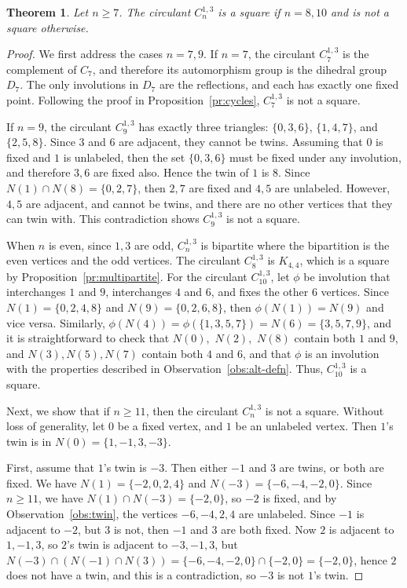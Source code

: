 \documentclass{article}
\newtheorem{theorem}{Theorem}[section]
\theoremstyle{definition}
\begin{document}
\begin{theorem} \label{thm:circ-1-3}
Let $n\geq 7$. 
The circulant $C_{n}^{1,3}$ is a square if $n=8,10$ and is not a square otherwise. 
\end{theorem}
\begin{proof}

We first address the cases $n=7,9$. If $n=7$, the circulant $C_7^{1,3}$ is the complement of $C_7$, and therefore its automorphism group is the dihedral group $D_7$. The only involutions in $D_7$ are the reflections, and each has exactly one fixed point. Following the proof in Proposition~\ref{pr:cycles},  $C_7^{1,3}$ is not a square. 

If $n=9$, the circulant $C_9^{1,3}$ has exactly three triangles: $\{0,3,6\}$,
$\{1,4,7\}$, and $\{2,5,8\}$. Since $3$ and $6$ are adjacent, they cannot be twins. Assuming that $0$ is fixed and $1$ is unlabeled, then the set $\{0,3,6\}$ must be fixed under any involution, and therefore $3,6$ are fixed also. Hence the twin of $1$ is $8$. Since $N(1)\cap N(8) =\{0,2,7\}$, then $2,7$ are fixed and $4,5$ are unlabeled. However, $4,5$ are adjacent, and cannot be twins, and there are no other vertices that they can twin with. This contradiction shows $C_9^{1,3}$ is not a square. 

When $n$ is even, since $1,3$ are odd, $C_n^{1,3}$ is bipartite where the bipartition is the even vertices and the odd vertices. The circulant $C_8^{1,3}$ is $K_{4,4}$, which is a square by Proposition~\ref{pr:multipartite}. 
For the circulant $C_{10}^{1,3}$, let $\phi$ be involution that interchanges $1$ and $9$,  interchanges $4$ and $6$, and fixes the other 6 vertices. Since $N(1)=\{0,2,4,8\}$ and $N(9)=\{0,2,6,8\}$, then $\phi(N(1))=N(9)$ and vice versa. Similarly, $\phi(N(4))=\phi(\{1,3,5,7\})=N(6)=\{3,5,7,9\}$, and it is straightforward to check that $N(0),$ $N(2),$ $N(8)$ contain both $1$ and $9$, and 
$N(3), N(5), N(7)$ contain both $4$ and $6$, and that $\phi$ is an involution with the properties described in Observation~\ref{obs:alt-defn}. Thus, 
$C_{10}^{1,3}$ is a square.

Next, we show that if $n\geq 11$, then the circulant $C_n^{1,3}$ is not a square. Without loss of generality, let $0$ be a fixed vertex, and $1$ be an unlabeled vertex. Then $1$'s twin is in $N(0)=\{1,-1,3,-3\}$. 

First, assume that $1$'s twin is $-3$. Then either $-1$ and $3$ are twins, or both are fixed. We have $N(1)=\{-2,0,2,4\}$ and $N(-3)=\{-6,-4,-2,0\}$. Since $n\geq 11$, we have $N(1)\cap N(-3) =\{-2,0\}$, so $-2$ is fixed, and by Observation~\ref{obs:twin}, the vertices $-6,-4, 2,4$ are unlabeled. Since $-1$ is adjacent to $-2$, but $3$ is not, then $-1$ and $3$ are both fixed. 
Now $2$ is adjacent to $1,-1,3$, so $2$'s twin is adjacent to $-3,-1,3$, but $N(-3)\cap (N(-1)\cap N(3)) = \{-6,-4,-2,0\}\cap \{-2,0\}=\{-2,0\}$, hence $2$ does not have a twin, and this is a contradiction, so $-3$ is not $1$'s twin. 


\end{proof}
\end{document}
